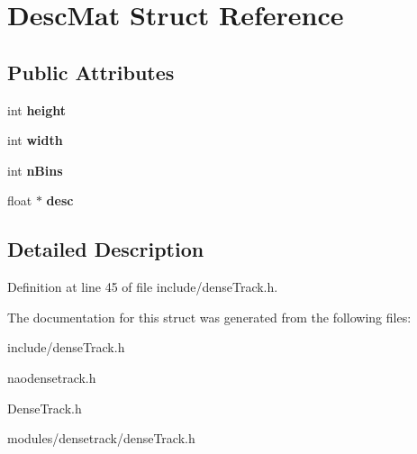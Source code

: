 \hypertarget{struct_desc_mat}{
\section{DescMat Struct Reference}
\label{struct_desc_mat}
}
\subsection*{Public Attributes}
\begin{DoxyCompactItemize}
\item 
\hypertarget{struct_desc_mat_aff048172ecf83cd5bf560dcee659587b}{
int {\bfseries height}}
\label{struct_desc_mat_aff048172ecf83cd5bf560dcee659587b}

\item 
\hypertarget{struct_desc_mat_aeddd5ec25bb3e937e94b0d0c8b639618}{
int {\bfseries width}}
\label{struct_desc_mat_aeddd5ec25bb3e937e94b0d0c8b639618}

\item 
\hypertarget{struct_desc_mat_ac632ac4453de96d5fdb167b18e941ec7}{
int {\bfseries nBins}}
\label{struct_desc_mat_ac632ac4453de96d5fdb167b18e941ec7}

\item 
\hypertarget{struct_desc_mat_ade0c8c0e407c3a7e167353bf02c56cab}{
float $\ast$ {\bfseries desc}}
\label{struct_desc_mat_ade0c8c0e407c3a7e167353bf02c56cab}

\end{DoxyCompactItemize}


\subsection{Detailed Description}


Definition at line 45 of file include/denseTrack.h.



The documentation for this struct was generated from the following files:\begin{DoxyCompactItemize}
\item 
include/denseTrack.h\item 
naodensetrack.h\item 
DenseTrack.h\item 
modules/densetrack/denseTrack.h\end{DoxyCompactItemize}
